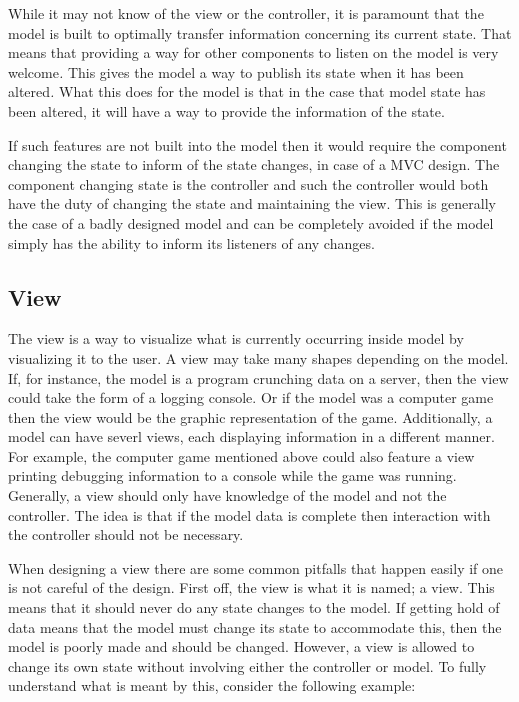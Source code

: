 While it may not know of the view or the controller, it is paramount
that the model is built to optimally transfer information concerning
its current state. That means that providing a way for other components
to listen on the model is very welcome\emph{. }This gives the model
a way to publish its state when it has been altered\emph{.} What this
does for the model is that in the case that model state has been altered,
it will have a way to provide the information of the state. 

If such features are not built into the model then it would require
the component changing the state to inform of the state changes, in
case of a MVC design. The component changing state is the controller
and such the controller would both have the duty of changing the state
and maintaining the view. This is generally the case of a badly designed
model and can be completely avoided if the model simply has the ability
to inform its listeners of any changes.


\subsection{View}

The view is a way to visualize what is currently occurring inside
model by visualizing it to the user. A view may take many shapes depending
on the model. If, for instance, the model is a program crunching data
on a server, then the view could take the form of a logging console.
Or if the model was a computer game then the view would be the graphic
representation of the game. Additionally, a model can have severl
views, each displaying information in a different manner. For example,
the computer game mentioned above could also feature a view printing
debugging information to a console while the game was running. Generally,
a view should only have knowledge of the model and not the controller.
The idea is that if the model data is complete then interaction with
the controller should not be necessary.

When designing a view there are some common pitfalls that happen easily
if one is not careful of the design. First off, the view is what it
is named; a view. This means that it should never do any state changes
to the model. If getting hold of data means that the model must change
its state to accommodate this, then the model is poorly made and should
be changed. However, a view is allowed to change its own state without
involving either the controller or model. To fully understand what
is meant by this, consider the following example:

